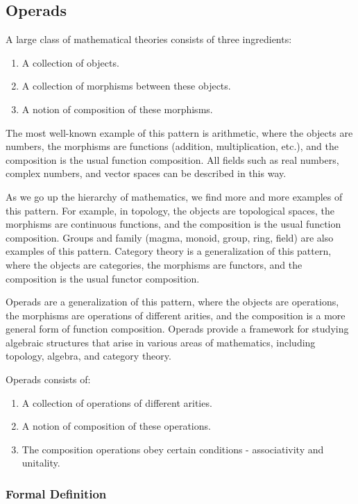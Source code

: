 
\subsection{Operads}

A large class of mathematical theories consists of three ingredients:
\begin{enumerate}
  \item A collection of objects.
  \item A collection of morphisms between these objects.
  \item A notion of composition of these morphisms.
\end{enumerate}

The most well-known example of this pattern is arithmetic, where the objects are numbers, the morphisms are functions (addition, multiplication, etc.), and the composition is the usual function composition. All fields such as real numbers, complex numbers, and vector spaces can be described in this way.

As we go up the hierarchy of mathematics, we find more and more examples of this pattern. For example, in topology, the objects are topological spaces, the morphisms are continuous functions, and the composition is the usual function composition. Groups and family (magma, monoid, group, ring, field) are also examples of this pattern. Category theory is a generalization of this pattern, where the objects are categories, the morphisms are functors, and the composition is the usual functor composition.

Operads are a generalization of this pattern, where the objects are operations, the morphisms are operations of different arities, and the composition is a more general form of function composition. Operads provide a framework for studying algebraic structures that arise in various areas of mathematics, including topology, algebra, and category theory.

Operads consists of:

\begin{enumerate}
  \item A collection of operations of different arities.
  \item A notion of composition of these operations.
  \item The composition operations obey certain conditions - associativity and unitality.
\end{enumerate}

\subsubsection{Formal Definition}
\\


